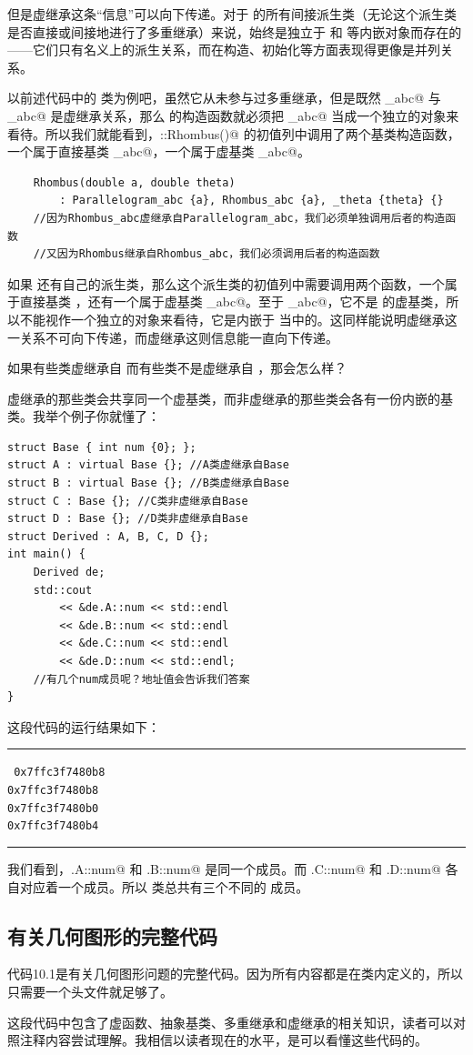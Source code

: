但是虚继承这条``信息''可以向下传递。对于 \lstinline@Base@ 的所有间接派生类（无论这个派生类是否直接或间接地进行了多重继承）来说，\lstinline@Base@ 始终是独立于 \lstinline@A@ 和 \lstinline@B@ 等内嵌对象而存在的——它们只有名义上的派生关系，而在构造、初始化等方面表现得更像是并列关系。\par
以前述代码中的 \lstinline@Rhombus@ 类为例吧，虽然它从未参与过多重继承，但是既然 \lstinline@Rhombus_abc@ 与 \lstinline@Parallelogram_abc@ 是虚继承关系，那么 \lstinline@Rhombus@ 的构造函数就必须把 \lstinline@Parallelogram_abc@ 当成一个独立的对象来看待。所以我们就能看到，\lstinline@Rhombus::Rhombus()@ 的初值列中调用了两个基类构造函数，一个属于直接基类 \lstinline@Rhombus_abc@，一个属于虚基类 \lstinline@Parallelogram_abc@。\par
\begin{lstlisting}
    Rhombus(double a, double theta)
        : Parallelogram_abc {a}, Rhombus_abc {a}, _theta {theta} {}
    //因为Rhombus_abc虚继承自Parallelogram_abc，我们必须单独调用后者的构造函数
    //又因为Rhombus继承自Rhombus_abc，我们必须调用后者的构造函数
\end{lstlisting}\par
如果 \lstinline@Rhombus@ 还有自己的派生类，那么这个派生类的初值列中需要调用两个函数，一个属于直接基类 \lstinline@Rhombus@，还有一个属于虚基类 \lstinline@Parallelogram_abc@。至于 \lstinline@Rhombus_abc@，它不是 \lstinline@Rhombus@ 的虚基类，所以不能视作一个独立的对象来看待，它是内嵌于 \lstinline@Rhombus@ 当中的。这同样能说明虚继承这一关系不可向下传递，而虚继承这则信息能一直向下传递。\par
{\kaishu 如果有些类虚继承自 \lstinline@Base@ 而有些类不是虚继承自 \lstinline@Base@，那会怎么样？}\par
虚继承的那些类会共享同一个虚基类，而非虚继承的那些类会各有一份内嵌的基类。我举个例子你就懂了：
\begin{lstlisting}
struct Base { int num {0}; };
struct A : virtual Base {}; //A类虚继承自Base
struct B : virtual Base {}; //B类虚继承自Base
struct C : Base {}; //C类非虚继承自Base
struct D : Base {}; //D类非虚继承自Base
struct Derived : A, B, C, D {};
int main() {
    Derived de;
    std::cout
        << &de.A::num << std::endl
        << &de.B::num << std::endl
        << &de.C::num << std::endl
        << &de.D::num << std::endl;
    //有几个num成员呢？地址值会告诉我们答案
}
\end{lstlisting}
这段代码的运行结果如下：\\\noindent\rule{\linewidth}{.2pt}\texttt{
0x7ffc3f7480b8\\
0x7ffc3f7480b8\\
0x7ffc3f7480b0\\
0x7ffc3f7480b4
}\\\noindent\rule{\linewidth}{.2pt}
我们看到，\lstinline@d.A::num@ 和 \lstinline@d.B::num@ 是同一个成员。而 \lstinline@d.C::num@ 和 \lstinline@d.D::num@ 各自对应着一个成员。所以 \lstinline@Derived@ 类总共有三个不同的 \lstinline@num@ 成员。\par
\subsection*{有关几何图形的完整代码}
代码10.1是有关几何图形问题的完整代码。因为所有内容都是在类内定义的，所以只需要一个头文件就足够了。\par
这段代码中包含了虚函数、抽象基类、多重继承和虚继承的相关知识，读者可以对照注释内容尝试理解。我相信以读者现在的水平，是可以看懂这些代码的。\par


